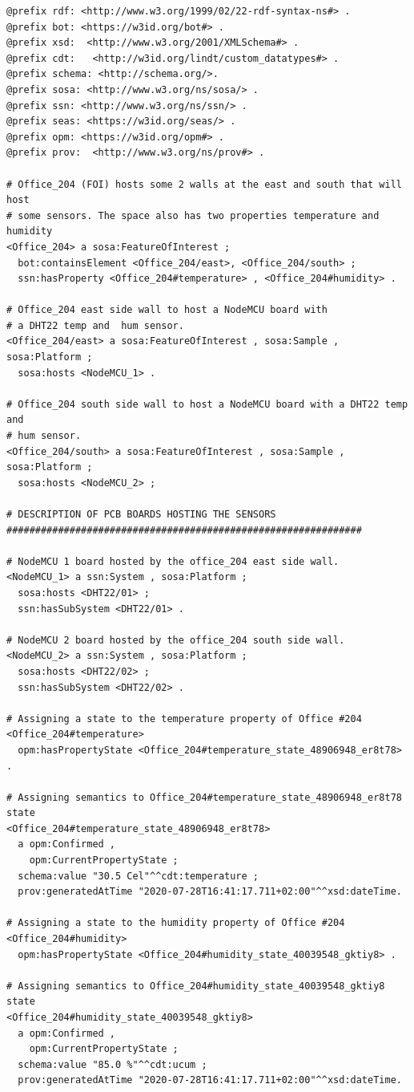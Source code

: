 \begin{lstlisting}[language=N3, caption={Turtle serialization of the information modelled in figure \ref{SSN_OPM_SEAS}.}, label=lst:SSN_OPM_SEASttl]
@prefix rdf: <http://www.w3.org/1999/02/22-rdf-syntax-ns#> .
@prefix bot: <https://w3id.org/bot#> .
@prefix xsd:  <http://www.w3.org/2001/XMLSchema#> .
@prefix cdt:   <http://w3id.org/lindt/custom_datatypes#> .
@prefix schema: <http://schema.org/>.
@prefix sosa: <http://www.w3.org/ns/sosa/> .
@prefix ssn: <http://www.w3.org/ns/ssn/> .
@prefix seas: <https://w3id.org/seas/> .
@prefix opm: <https://w3id.org/opm#> .
@prefix prov:  <http://www.w3.org/ns/prov#> .

# Office_204 (FOI) hosts some 2 walls at the east and south that will host 
# some sensors. The space also has two properties temperature and humidity
<Office_204> a sosa:FeatureOfInterest ;
  bot:containsElement <Office_204/east>, <Office_204/south> ;
  ssn:hasProperty <Office_204#temperature> , <Office_204#humidity> .

# Office_204 east side wall to host a NodeMCU board with 
# a DHT22 temp and  hum sensor.  
<Office_204/east> a sosa:FeatureOfInterest , sosa:Sample , sosa:Platform ;
  sosa:hosts <NodeMCU_1> .
  
# Office_204 south side wall to host a NodeMCU board with a DHT22 temp and 
# hum sensor.                
<Office_204/south> a sosa:FeatureOfInterest , sosa:Sample , sosa:Platform ;
  sosa:hosts <NodeMCU_2> ;

# DESCRIPTION OF PCB BOARDS HOSTING THE SENSORS
##############################################################

# NodeMCU 1 board hosted by the office_204 east side wall.
<NodeMCU_1> a ssn:System , sosa:Platform ;
  sosa:hosts <DHT22/01> ;
  ssn:hasSubSystem <DHT22/01> .

# NodeMCU 2 board hosted by the office_204 south side wall.
<NodeMCU_2> a ssn:System , sosa:Platform ;
  sosa:hosts <DHT22/02> ;
  ssn:hasSubSystem <DHT22/02> .
  
# Assigning a state to the temperature property of Office #204   
<Office_204#temperature> 
  opm:hasPropertyState <Office_204#temperature_state_48906948_er8t78> .
  
# Assigning semantics to Office_204#temperature_state_48906948_er8t78 state
<Office_204#temperature_state_48906948_er8t78> 
  a opm:Confirmed , 
    opm:CurrentPropertyState ;
  schema:value "30.5 Cel"^^cdt:temperature ;
  prov:generatedAtTime "2020-07-28T16:41:17.711+02:00"^^xsd:dateTime.

# Assigning a state to the humidity property of Office #204  
<Office_204#humidity> 
  opm:hasPropertyState <Office_204#humidity_state_40039548_gktiy8> .
  
# Assigning semantics to Office_204#humidity_state_40039548_gktiy8 state
<Office_204#humidity_state_40039548_gktiy8> 
  a opm:Confirmed , 
    opm:CurrentPropertyState ;
  schema:value "85.0 %"^^cdt:ucum ;
  prov:generatedAtTime "2020-07-28T16:41:17.711+02:00"^^xsd:dateTime. 
\end{lstlisting}

